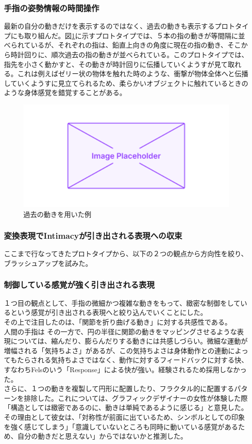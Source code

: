 \subsubsection*{手指の姿勢情報の時間操作}
最新の自分の動きだけを表示するのではなく、過去の動きも表示するプロトタイプにも取り組んだ。図\ref{fig:prototype_delay}に示すプロトタイプでは、５本の指の動きが等間隔に並べられているが、それぞれの指は、鉛直上向きの角度に現在の指の動き、そこから時計回りに、順次過去の指の動きが並べられている。このプロトタイプでは、指先を小さく動かすと、その動きが時計回りに伝播していくようすが見て取れる。これは例えばゼリー状の物体を触れた時のような、衝撃が物体全体へと伝播していくようすに見立てられるため、柔らかいオブジェクトに触れているときのような身体感覚を錯覚することがある。

\begin{figure}[H]
  \centering
  \includegraphics[width=15cm]{img/placeholder.png}
  \caption{過去の動きを用いた例}
  \label{fig:prototype_delay}
\end{figure}
\subsubsection{変換表現でIntimacyが引き出される表現への収束}
ここまで行なってきたプロトタイプから、以下の２つの観点から方向性を絞り、ブラッシュアップを試みた。
\subsubsection*{制御している感覚が強く引き出される表現}
１つ目の観点として、手指の微細かつ複雑な動きをもって、緻密な制御をしているという感覚が引き出される表現へと絞り込んでいくことにした。\\
その上で注目したのは、「関節を折り曲げる動き」に対する共感性である。\\
人間の手指は
その一方で、円の半径に関節の動きをマッピングさせるような表現については、縮んだり、膨らんだりする動きには共感しづらい。微細な運動が増幅される「気持ちよさ」があるが、この気持ちよさは身体動作との連動によってもたらされる気持ちよさではなく、動作に対するフィードバックに対する快、すなわちFelsのいう「Response」による快が強い。経験されるため採用しなかった。\\
さらに、１つの動きを複製して円形に配置したり、フラクタル的に配置するパターンを排除した。これについては、グラフィックデザイナーの女性が体験した際「構造としては緻密であるのに、動きは単純であるように感じる」と意見した。その理由として彼女は、「対称性が前面に出ているため、シンボルとしての印象を強く感じてしまう」「意識していないところも同時に動いている感覚があるため、自分の動きだと思えない」からではないかと推測した。

